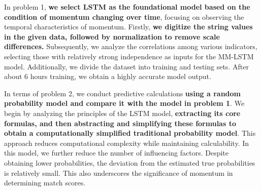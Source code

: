 
In problem 1,\textbf{ we select LSTM as the foundational model based on the condition of momentum changing over time}, focusing on observing the temporal characteristics of momentum. Firstly, \textbf{we digitize the string values in the given data, followed by normalization to remove scale differences. }Subsequently, we analyze the correlations among various indicators, selecting those with relatively strong independence as inputs for the MM-LSTM model. Additionally, we divide the dataset into training and testing sets. After about 6 hours training, we obtain a highly accurate model output.


In terms of problem 2, we conduct predictive calculations \textbf{using a random probability model and compare it with the model in problem 1}. We begin by analyzing the principles of the LSTM model,\textbf{ extracting its core formulas, and then abstracting and simplifying these formulas to obtain a computationally simplified traditional probability model}. This approach reduces computational complexity while maintaining calculability. In this model, we further reduce the number of influencing factors. Despite obtaining lower probabilities, the deviation from the estimated true probabilities is relatively small. This also underscores the significance of momentum in determining match scores.


